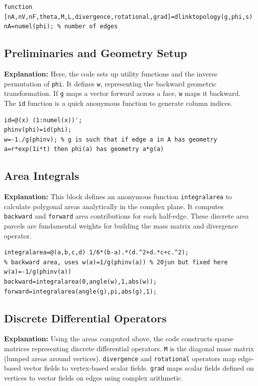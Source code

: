\begin{lstlisting}[style=matlab]
function [nA,nV,nF,theta,M,L,divergence,rotational,grad]=dlinktopology(g,phi,s)
nA=numel(phi); % number of edges
\end{lstlisting}

\subsection{Preliminaries and Geometry Setup}
\textbf{Explanation:} Here, the code sets up utility functions and the inverse permutation of \texttt{phi}. It defines \texttt{w}, representing the backward geometric transformation. If \texttt{g} maps a vector forward across a face, \texttt{w} maps it backward. The \texttt{id} function is a quick anonymous function to generate column indices.

\begin{lstlisting}[style=matlab]
% preliminaries
id=@(x) (1:numel(x))';
phinv(phi)=id(phi);
w=-1./g(phinv); % g is such that if edge a in A has geometry a=r*exp(1i*t) then phi(a) has geometry a*g(a)
\end{lstlisting}

\subsection{Area Integrals}
\textbf{Explanation:} This block defines an anonymous function \texttt{integralarea} to calculate polygonal areas analytically in the complex plane. It computes \texttt{backward} and \texttt{forward} area contributions for each half-edge. These discrete area parcels are fundamental weights for building the mass matrix and divergence operator.

\begin{lstlisting}[style=matlab]
integralarea=@(a,b,c,d) 1/6*(b-a).*(d.^2+d.*c+c.^2);
% backward area, uses w(a)=1/g(phinv(a)) % 20jun but fixed here w(a)=-1/g(phinv(a))
backward=integralarea(0,angle(w),1,abs(w));
forward=integralarea(angle(g),pi,abs(g),1);
\end{lstlisting}

\subsection{Discrete Differential Operators}
\textbf{Explanation:} Using the areas computed above, the code constructs sparse matrices representing discrete differential operators. \texttt{M} is the diagonal mass matrix (lumped areas around vertices). \texttt{divergence} and \texttt{rotational} operators map edge-based vector fields to vertex-based scalar fields. \texttt{grad} maps scalar fields defined on vertices to vector fields on edges using complex arithmetic.

